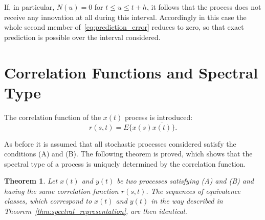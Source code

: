 \documentclass[11pt]{article}
\newtheorem{theorem}{Theorem}
\begin{document}
If, in particular, $N(u) = 0$ for $t \leq u \leq t + h$, it follows that the process does not receive any innovation at all during this interval. Accordingly in this case the whole second member of~\eqref{eq:prediction_error} reduces to zero, so that exact prediction is possible over the interval considered.

\section{Correlation Functions and Spectral Type}

The correlation function of the $x(t)$ process is introduced:
\begin{equation}
r(s, t) = E\{x(s)\overline{x(t)}\}.
\label{eq:correlation_function}
\end{equation}

As before it is assumed that all stochastic processes considered satisfy the conditions (A) and (B). The following theorem is proved, which shows that the spectral type of a process is uniquely determined by the correlation function.

\begin{theorem}\label{thm:correlation_determines_type}
Let $x(t)$ and $y(t)$ be two processes satisfying (A) and (B) and having the same correlation function $r(s, t)$. The sequences of equivalence classes, which correspond to $x(t)$ and $y(t)$ in the way described in Theorem~\ref{thm:spectral_representation}, are then identical.
\end{theorem}
\end{document}
